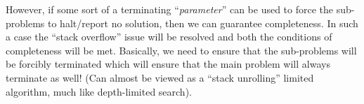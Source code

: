 \documentclass[10pt, letter]{article}
\begin{document}
However, if some sort of a terminating ``\textit{parameter}'' can be used to force the sub-problems to halt/report no solution, then we can guarantee completeness. In such a case the ``stack overflow'' issue will be resolved and both the conditions of completeness will be met. Basically, we need to ensure that the sub-problems will be forcibly terminated which will ensure that the main problem will always terminate as well! (Can almost be viewed as a ``stack unrolling'' limited algorithm, much like depth-limited search).




\end{document}
